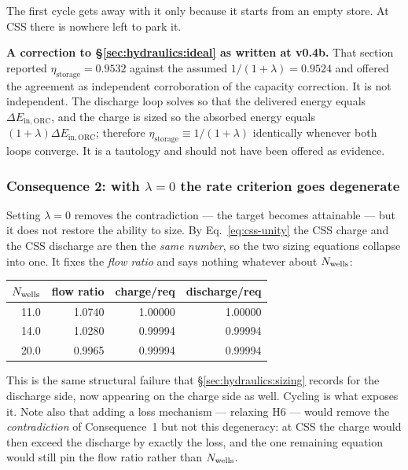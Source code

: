 \noindent
The first cycle gets away with it only because it starts from an empty store. At
CSS there is nowhere left to park it.

\medskip
\noindent\textbf{A correction to \S\ref{sec:hydraulics:ideal} as written at
v0.4b.} That section reported $\eta_{\mathrm{storage}}=0.9532$ against the
assumed $1/(1+\lambda)=0.9524$ and offered the agreement as independent
corroboration of the capacity correction. It is not independent. The discharge
loop solves so that the delivered energy equals $\Delta E_{\mathrm{in,ORC}}$,
and the charge is sized so the absorbed energy equals
$(1+\lambda)\Delta E_{\mathrm{in,ORC}}$; therefore
$\eta_{\mathrm{storage}}\equiv 1/(1+\lambda)$ identically whenever both loops
converge. It is a tautology and should not have been offered as evidence.

\subsubsection*{Consequence 2: with $\lambda=0$ the rate criterion goes degenerate}

Setting $\lambda=0$ removes the contradiction --- the target becomes attainable
--- but it does not restore the ability to size. By
Eq.~\eqref{eq:css-unity} the CSS charge and the CSS discharge are then the
\emph{same number}, so the two sizing equations collapse into one. It fixes the
\emph{flow ratio} and says nothing whatever about $N_{\mathrm{wells}}$:

\begin{center}
\begin{tabular}{@{}r r r r@{}}
\toprule
$N_{\mathrm{wells}}$ & flow ratio & charge/req & discharge/req \\
\midrule
11.0 & 1.0740 & 1.00000 & 1.00000 \\
14.0 & 1.0280 & 0.99994 & 0.99994 \\
20.0 & 0.9965 & 0.99994 & 0.99994 \\
\bottomrule
\end{tabular}
\end{center}

\noindent
This is the same structural failure that \S\ref{sec:hydraulics:sizing} records
for the discharge side, now appearing on the charge side as well. Cycling is
what exposes it. Note also that adding a loss mechanism --- relaxing H6 ---
would remove the \emph{contradiction} of Consequence~1 but not this degeneracy:
at CSS the charge would then exceed the discharge by exactly the loss, and the
one remaining equation would still pin the flow ratio rather than $N_{\mathrm{wells}}$.

